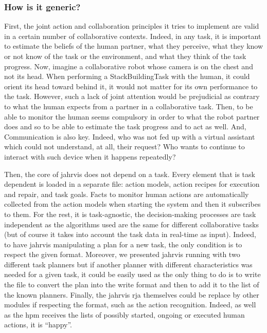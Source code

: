 \documentclass[a4paper,11pt,twoside]{StyleThese}
\begin{document}
\subsubsection*{How is it generic?}
First, the joint action and collaboration principles it tries to implement are valid in a certain number of collaborative contexts. Indeed, in any task, it is important to estimate the beliefs of the human partner, \ie what they perceive, what they know or not know of the task or the environment, and what they think of the task progress. Now, imagine a collaborative robot whose camera is on the chest and not its head. When performing a StackBuildingTask with the human, it could orient its head toward behind it, it would not matter for its own performance to the task. However, such a lack of joint attention would be prejudicial as contrary to what the human expects from a partner in a collaborative task. Then, to be able to monitor the human seems compulsory in order to what the robot partner does and so to be able to estimate the task progress and to act as well. And, Communication is also key. Indeed, who was not fed up with a virtual assistant which could not understand, at all, their request? Who wants to continue to interact with such device when it happens repeatedly? 

Then, the core of \acrshort{jahrvis} does not depend on a task. Every element that is task dependent is loaded in a separate file: action models, action recipes for execution and repair, and task goals. Facts to monitor human actions are automatically collected from the action models when starting the system and then it subscribes to them. For the rest, it is task-agnostic, the decision-making processes are task independent as the algorithms used are the same for different collaborative tasks (but of course it takes into account the task data in real-time as input). Indeed, to have \acrshort{jahrvis} manipulating a plan for a new task, the only condition is to respect the given format. Moreover, we presented \acrshort{jahrvis} running with two different task planners but if another planner with different characteristics was needed for a given task, it could be easily used as the only thing to do is to write the file to convert the plan into the write format and then to add it to the list of the known planners. Finally, the \acrshort{jahrvis} \acrshort{rja} themselves could be replace by other modules if respecting the format, such as the action recognition. Indeed, as well as the \acrlong{hpm} receives the lists of possibly started, ongoing or executed human actions, it is ``happy''.
\end{document}
